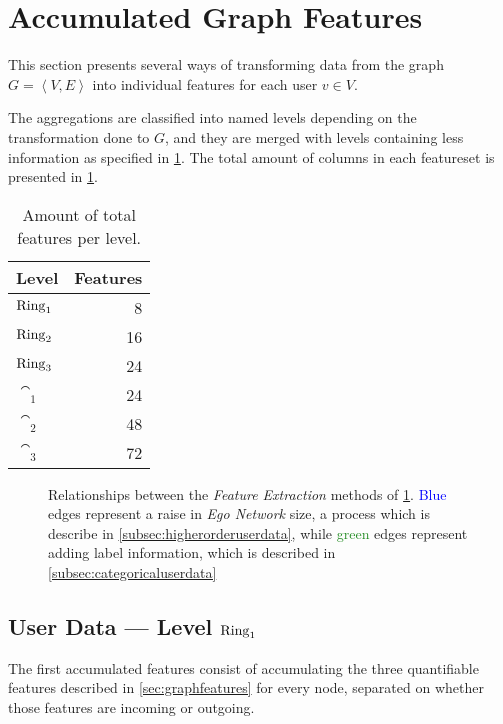 \section{Accumulated Graph Features}
\label{sec:accumulatedfeatures}

This section presents several ways of transforming data from the graph $G = \left< V, E \right>$ into individual features for each user $v \in V$.

The aggregations are classified into named levels depending on the transformation done to $G$, and they are merged with levels containing less information as specified in \cref{fig:mlrelationships}. The total amount of columns in each featureset is presented in \cref{tab:features}.

\begin{table}
\centering
\begin{tabular}{>{\bfseries}l r}
\toprule
Level & Features \\
\midrule
$\operatorname{Ring}_1$ & \num{8}  \\
$\operatorname{Ring}_2$ & \num{16} \\
$\operatorname{Ring}_3$ & \num{24} \\
$\cat_1$ & \num{24} \\
$\cat_2$ & \num{48} \\
$\cat_3$ & \num{72} \\
\bottomrule
\end{tabular}
\caption{Amount of total features per level.}
\label{tab:features}
\end{table}

\begin{figure}
\centering
\resizebox{!}{.2\textheight}{%
	\framebox{%
		
	}
}
\caption{Relationships between the \emph{Feature Extraction} methods of \cref{sec:accumulatedfeatures}. \textcolor{Blue}{Blue} edges represent a raise in \emph{Ego Network} size, a process which is describe in \cref{subsec:higherorderuserdata}, while \textcolor{ForestGreen}{green} edges represent adding label information, which is described in \cref{subsec:categoricaluserdata}}
\label{fig:mlrelationships}
\end{figure}

\subsection{User Data --- Level $\operatorname{Ring}_1$}
\label{subsec:user_data}

The first accumulated features consist of accumulating the three quantifiable features described in \cref{sec:graphfeatures} for every node, separated on whether those features are incoming or outgoing.

